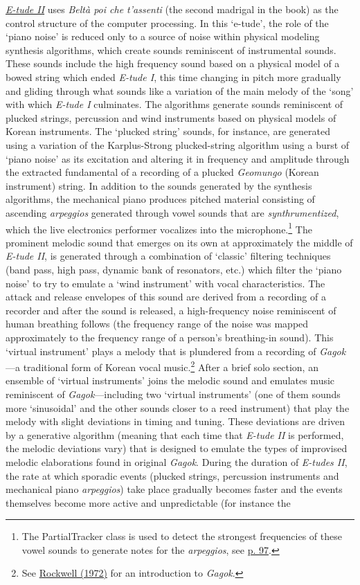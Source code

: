 \href{http://www.federicoreuben.com/media/audio/mp3/CompositionsPhD/02%20E-tude%20II.mp3}{\emph{E-tude II}} uses \emph{Belt\`{a} poi che t'assenti} (the second madrigal in the book) as the control structure of the computer processing. In this `e-tude', the role of the `piano noise' is reduced only to a source of noise within physical modeling synthesis algorithms, which create sounds reminiscent of instrumental sounds. These sounds include the high frequency sound based on a physical model of a bowed string which ended \emph{E-tude I}, this time changing in pitch more gradually and gliding through what sounds like a variation of the main melody of the `song' with which \emph{E-tude I} culminates. The algorithms generate sounds reminiscent of plucked strings, percussion and wind instruments based on physical models of Korean instruments. The `plucked string' sounds, for instance, are generated using a variation of the Karplus-Strong plucked-string algorithm using a burst of `piano noise' as its excitation and altering it in frequency and amplitude through the extracted fundamental of a recording of a plucked \emph{Geomungo} (Korean instrument) string. In addition to the sounds generated by the synthesis algorithms, the mechanical piano produces pitched material consisting of ascending \emph{arpeggios} generated through vowel sounds that are \emph{synthrumentized}, which the live electronics performer vocalizes into the microphone.\footnote{The PartialTracker class is used to detect the strongest frequencies of these vowel sounds to generate notes for the \emph{arpeggios}, see \hyperlink{partrack}{p. 97}.} The prominent melodic sound that emerges on its own at approximately the middle of \emph{E-tude II}, is generated through a combination of `classic' filtering techniques (band pass, high pass, dynamic bank of resonators, etc.) which filter the `piano noise' to try to emulate a `wind instrument' with vocal characteristics. The attack and release envelopes of this sound are derived from a recording of a recorder and after the sound is released, a high-frequency noise reminiscent of human breathing follows (the frequency range of the noise was mapped approximately to the frequency range of a person's breathing-in sound). This `virtual instrument' plays a melody that is plundered from a recording of \emph{Gagok}---a traditional form of Korean vocal music.\footnote{See \hyperlink{rockwell}{Rockwell (1972)} for an introduction to \emph{Gagok}.} After a brief solo section, an ensemble of `virtual instruments' joins the melodic sound and emulates music reminiscent of \emph{Gagok}---including two `virtual instruments' (one of them sounds more `sinusoidal' and the other sounds closer to a reed instrument) that play the melody with slight deviations in timing and tuning. These deviations are driven by a generative algorithm (meaning that each time that \emph{E-tude II} is performed, the melodic deviations vary) that is designed to emulate the types of improvised melodic elaborations found in original \emph{Gagok}. During the duration of \emph{E-tudes II}, the rate at which sporadic events (plucked strings, percussion instruments and mechanical piano \emph{arpeggios}) take place gradually becomes faster and the events themselves become more active and unpredictable (for instance the 